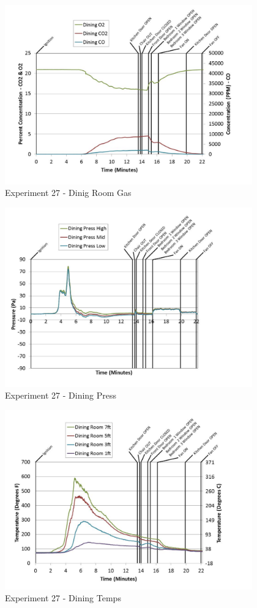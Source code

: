 \documentclass{article}
\begin{document}
\begin{appendices}
	\begin{figure}[h!]
		\centering
		\includegraphics[height=3.05in]{0_Images/Results_Charts/Exp_27_Charts/DinigRoomGas.pdf}
		\caption{Experiment 27 - Dinig Room Gas}
	\end{figure}
 
	\clearpage

	\begin{figure}[h!]
		\centering
		\includegraphics[height=3.05in]{0_Images/Results_Charts/Exp_27_Charts/DiningPress.pdf}
		\caption{Experiment 27 - Dining Press}
	\end{figure}
 

	\begin{figure}[h!]
		\centering
		\includegraphics[height=3.05in]{0_Images/Results_Charts/Exp_27_Charts/DiningTemps.pdf}
		\caption{Experiment 27 - Dining Temps}
	\end{figure}
 

\end{appendices}
\end{document}

